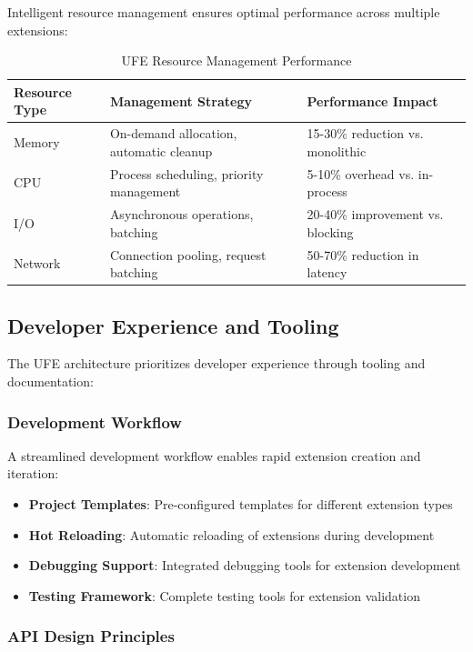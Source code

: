 Intelligent resource management ensures optimal performance across multiple extensions:

\begin{table}[ht]
\centering
\begin{tabular}{@{}lll@{}}
\toprule
\textbf{Resource Type} & \textbf{Management Strategy} & \textbf{Performance Impact} \\
\midrule
Memory & On-demand allocation, automatic cleanup & 15-30\% reduction vs. monolithic \\
CPU & Process scheduling, priority management & 5-10\% overhead vs. in-process \\
I/O & Asynchronous operations, batching & 20-40\% improvement vs. blocking \\
Network & Connection pooling, request batching & 50-70\% reduction in latency \\
\bottomrule
\end{tabular}
\caption{UFE Resource Management Performance}
\label{tab:ufe-resource-performance}
\end{table}

\subsection{Developer Experience and Tooling}

The UFE architecture prioritizes developer experience through tooling and documentation:

\subsubsection{Development Workflow}

A streamlined development workflow enables rapid extension creation and iteration:

\begin{itemize}
    \item \textbf{Project Templates}: Pre-configured templates for different extension types
    \item \textbf{Hot Reloading}: Automatic reloading of extensions during development
    \item \textbf{Debugging Support}: Integrated debugging tools for extension development
    \item \textbf{Testing Framework}: Complete testing tools for extension validation
\end{itemize}

\subsubsection{API Design Principles}

